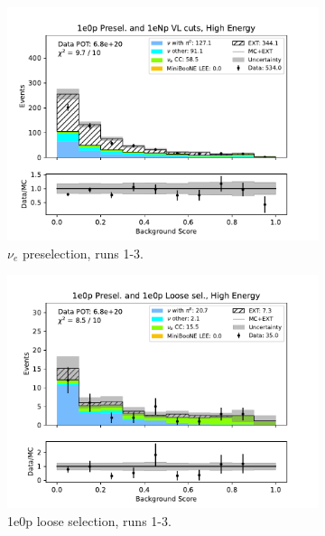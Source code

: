 \begin{figure}[H]
    \centering
    \begin{subfigure}{0.33\linewidth}
    \includegraphics[width=\linewidth]{technote/Sidebands/Figures/FarSideband/far_sideband_bkg_score_run123_ZP_ZP_HIGH_ENERGY.pdf}
    \caption{$\nu_e$ preselection, runs 1-3.}
    \end{subfigure}%
    \begin{subfigure}{0.33\linewidth}
    \includegraphics[width=\linewidth]{technote/Sidebands/Figures/FarSideband/far_sideband_bkg_score_run123_ZP_ZPLOOSESEL_HIGH_ENERGY.pdf}
    \caption{1e0p loose selection, runs 1-3.}
    \end{subfigure}%
    \begin{subfigure}{0.33\linewidth}

\end{subfigure}
\end{figure}
